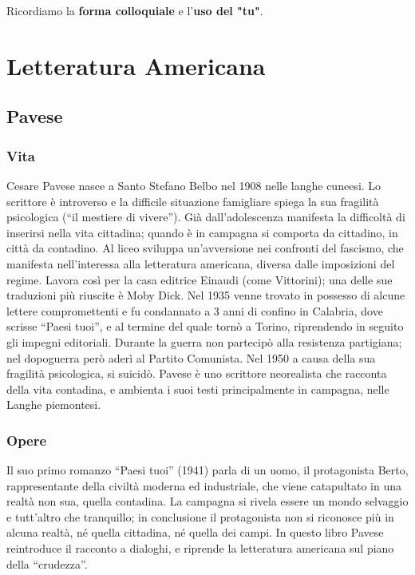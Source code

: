 \documentclass[10pt]{report}
\begin{document}
		Ricordiamo la \textbf{forma colloquiale} e l'\textbf{uso del "tu"}.
	
	\chapter{Letteratura Americana}
	
		\section{Pavese}
		\subsection[Vita]{Vita}
		Cesare Pavese nasce a Santo Stefano Belbo nel 1908 nelle langhe cuneesi. Lo scrittore è introverso e la difficile situazione famigliare spiega la sua fragilità psicologica (“il mestiere di vivere”). Già dall’adolescenza manifesta la difficoltà di inserirsi nella vita cittadina; quando è in campagna si comporta da cittadino, in città da contadino. 
		Al liceo sviluppa un’avversione nei confronti del fascismo, che manifesta nell’interessa alla letteratura americana, diversa dalle imposizioni del regime. Lavora così per la casa editrice Einaudi (come Vittorini); una delle sue traduzioni più riuscite è Moby Dick. Nel 1935 venne trovato in possesso di alcune lettere compromettenti e fu condannato a 3 anni di confino in Calabria, dove scrisse “Paesi tuoi”, e al termine del quale tornò a Torino, riprendendo in seguito gli impegni editoriali. Durante la guerra non partecipò alla resistenza partigiana; nel dopoguerra però aderì al Partito Comunista. Nel 1950 a causa della sua fragilità psicologica, si suicidò.
		Pavese è uno scrittore neorealista che racconta della vita contadina, e ambienta i suoi testi principalmente in campagna, nelle Langhe piemontesi. 
		
		\subsection[Opere]{Opere}	
		Il suo primo romanzo “Paesi tuoi” (1941) parla di un uomo, il protagonista Berto, rappresentante della civiltà moderna ed industriale, che viene catapultato in una realtà non sua, quella contadina. La campagna si rivela essere un mondo selvaggio e tutt’altro che tranquillo; in conclusione il protagonista non si riconosce più in alcuna realtà, né quella cittadina, né quella dei campi. In questo libro Pavese reintroduce il racconto a dialoghi, e riprende la letteratura americana sul piano della “crudezza”.
		
\end{document}
